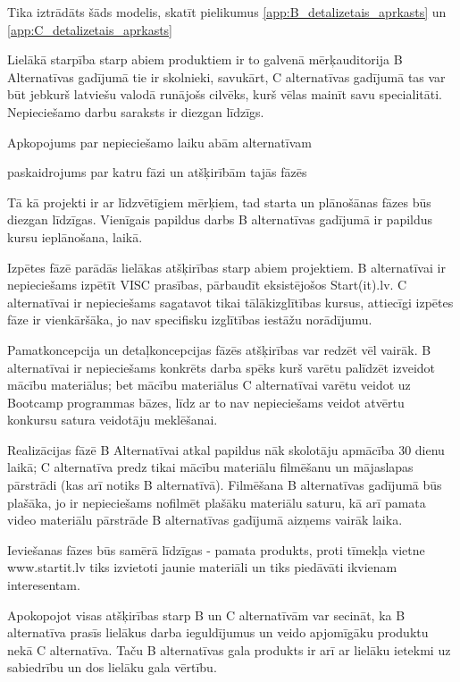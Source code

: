 \par
Tika iztrādāts šāds modelis, skatīt pielikumus \ref{app:B_detalizetais_aprkasts} un \ref{app:C_detalizetais_aprkasts}
\par
Lielākā starpība starp abiem produktiem ir to galvenā mērķauditorija B Alternatīvas gadījumā tie ir skolnieki, savukārt,
C alternatīvas gadījumā tas var būt jebkurš latviešu valodā runājošs cilvēks, kurš vēlas mainīt savu specialitāti.
Nepieciešamo darbu saraksts ir diezgan līdzīgs.
\par
Apkopojums par nepieciešamo laiku abām alternatīvam
\par
paskaidrojums par katru fāzi un atšķirībām tajās fāzēs
\par
Tā kā projekti ir ar līdzvētīgiem mērķiem, tad starta un plānošānas fāzes būs diezgan līdzīgas. Vienīgais papildus darbs
B alternatīvas gadījumā ir papildus kursu ieplānošana, laikā.
\par
Izpētes fāzē parādās lielākas atšķirības starp abiem projektiem. B alternatīvai ir nepieciešams izpētīt VISC prasības,
pārbaudīt eksistējošos Start(it).lv. C alternatīvai ir nepieciešams sagatavot tikai tālākizglītības kursus, attiecīgi
izpētes fāze ir vienkāršāka, jo nav specifisku izglītības iestāžu norādījumu.
\par
Pamatkoncepcija un detaļkoncepcijas fāzēs atšķirības var redzēt vēl vairāk. B alternatīvai ir 
nepieciešams konkrēts darba spēks kurš varētu palīdzēt izveidot mācību materiālus; bet mācību materiālus C alternatīvai
varētu veidot uz Bootcamp programmas bāzes, līdz ar to nav nepieciešams veidot atvērtu konkursu satura veidotāju meklēšanai.
\par
Realizācijas fāzē B Alternatīvai atkal papildus nāk skolotāju apmācība 30 dienu laikā; C alternatīva predz tikai mācību materiālu
filmēšanu un mājaslapas pārstrādi (kas arī notiks B alternatīvā). Filmēšana B alternatīvas gadījumā būs plašāka, jo ir nepieciešams
nofilmēt plašāku materiālu saturu, kā arī pamata video materiālu pārstrāde B alternatīvas gadījumā aizņems vairāk laika.
\par
Ieviešanas fāzes būs samērā līdzīgas - pamata produkts, proti tīmekļa vietne www.startit.lv tiks izvietoti jaunie materiāli un
tiks piedāvāti ikvienam interesentam.
\par
Apokopojot visas atšķirības starp B un C alternatīvām var secināt, ka B alternatīva prasīs lielākus darba ieguldījumus un veido
apjomīgāku produktu nekā C alternatīva. Taču B alternatīvas gala produkts ir arī ar lielāku ietekmi uz sabiedrību un dos lielāku
gala vērtību.
